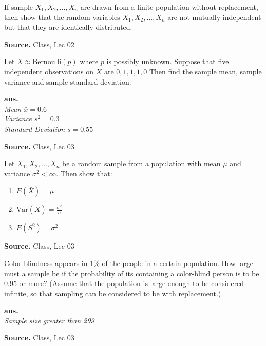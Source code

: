 \documentclass[12pt,twoside]{report}
\newenvironment*{ans}{\textbf{ans.}\space\em\\}{\par}
\newenvironment*{source}{\hfill\scriptsize\textbf{Source.}\space}{\par}
\begin{document}
\begin{ex}
If sample $X_1, X_2, ..., X_n$ are drawn from  a finite population without replacement, then show that the random variables $X_1, X_2, ...,X_n$ are not mutually independent but that they are identically distributed.
\end{ex}
\begin{source}
Class, Lec 02 
\end{source}

\begin{samepage}
\begin{ex}
Let $X \approx \text{Bernoulli}\left (p\right )$ where $p$ is possibly unknown. Suppose that five independent observations on $X$ are $0,1,1,1,0$ Then find the sample mean, sample variance and sample standard deviation.
\end{ex}
\begin{ans}
Mean $\bar{x} = 0.6$\\
Variance $s^2 = 0.3$ \\
Standard Deviation $s = 0.55$ 
\end{ans}
\begin{source}
Class, Lec 03
\end{source}
\end{samepage}

\begin{samepage}
\begin{ex}
    Let $X_1, X_2, ..., X_n$ be a random sample from a population with mean $\mu $ and variance $\sigma ^2 < \infty$. Then show that:
    \begin{enumerate}
        \item $E\left (\bar{X}\right ) = \mu $
        \item $\text{Var}\left (\bar{X}\right ) = \frac{\sigma ^2}{n}$
        \item $E\left (S ^2\right ) = \sigma ^2$
    \end{enumerate}
\end{ex}
\begin{source}
Class, Lec 03
\end{source}
\end{samepage}

\begin{samepage}
\begin{ex}
Color blindness appears in 1\%  of the people in a certain population. How large must a sample be if the probability of its containing a color-blind person is to be 0.95 or more? (Assume that the population is large enough to be considered infinite, so that sampling can be considered to be with replacement.)
\end{ex}
\begin{ans}
Sample size greater than 299
\end{ans}
\begin{source}
Class, Lec 03
\end{source}
\end{samepage}
\end{document}
